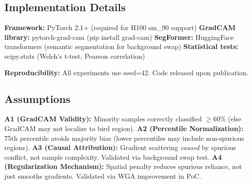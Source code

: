\subsection{Implementation Details}

\textbf{Framework:} PyTorch 2.1+ (required for H100 sm\_90 support)
\textbf{GradCAM library:} pytorch-grad-cam (pip install grad-cam)
\textbf{SegFormer:} HuggingFace transformers (semantic segmentation for background swap)
\textbf{Statistical tests:} scipy.stats (Welch's t-test, Pearson correlation)

\textbf{Reproducibility:} All experiments use seed=42. Code released upon publication.

\subsection{Assumptions}

\textbf{A1 (GradCAM Validity):} Minority samples correctly classified $\geq$60\% (else GradCAM may not localize to bird region).
\textbf{A2 (Percentile Normalization):} 75th percentile avoids majority bias (lower percentiles may include non-spurious regions).
\textbf{A3 (Causal Attribution):} Gradient scattering \emph{caused} by spurious conflict, not sample complexity. Validated via background swap test.
\textbf{A4 (Regularization Mechanism):} Spatial penalty reduces spurious reliance, not just smooths gradients. Validated via WGA improvement in PoC.
